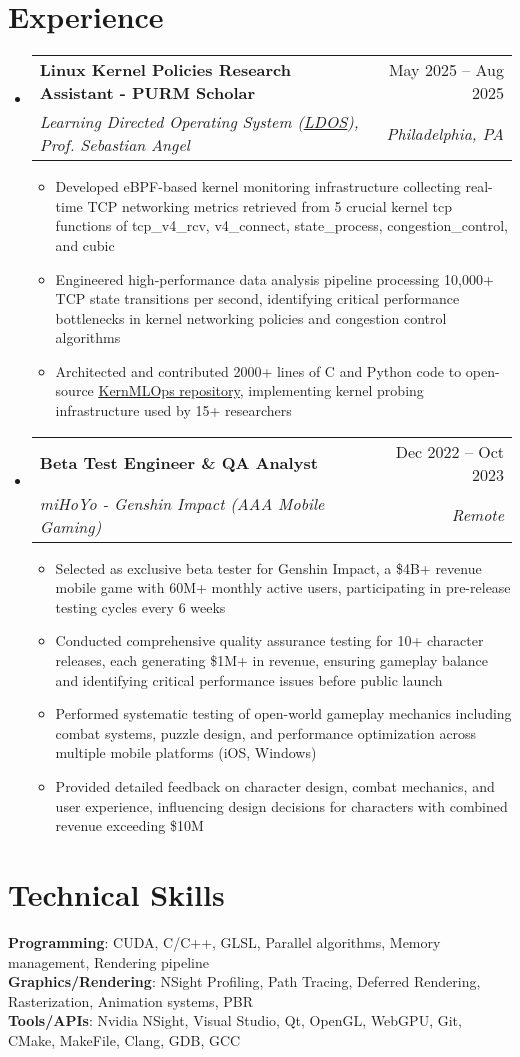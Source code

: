 \documentclass[letterpaper,11pt]{article}
\makeatletter
\newcommand{\resumeItem}[1]{
  \item\small{
    {#1 \vspace{-3pt}}
  }
}
\newcommand{\resumeSubheading}[4]{
  \vspace{-2pt}\item
    \begin{tabular*}{0.97\textwidth}[t]{l@{\extracolsep{\fill}}r}
      \textbf{#1} & #2 \\
      \textit{\small#3} & \textit{\small #4} \\
    \end{tabular*}\vspace{-7pt}
}
\newcommand{\resumeSubHeadingListStart}{\begin{itemize}[leftmargin=0.15in, label={}]}
\newcommand{\resumeSubHeadingListEnd}{\end{itemize}}
\newcommand{\resumeItemListStart}{\begin{itemize}}
\newcommand{\resumeItemListEnd}{\end{itemize}\vspace{-5pt}}
\makeatother
\begin{document}
\section{Experience}
  \resumeSubHeadingListStart
    \resumeSubheading
      {Linux Kernel Policies Research Assistant - PURM Scholar}{May 2025 -- Aug 2025}
      {Learning Directed Operating System (\href{https://ldos.utexas.edu/}{\underline{LDOS}}), Prof. Sebastian Angel}{Philadelphia, PA}
      \resumeItemListStart
        \resumeItem{Developed eBPF-based kernel monitoring infrastructure collecting real-time TCP networking metrics retrieved from 5 crucial kernel tcp functions of tcp\_v4\_rcv, v4\_connect, state\_process, congestion\_control, and cubic}
        \resumeItem{Engineered high-performance data analysis pipeline processing 10,000+ TCP state transitions per second, identifying critical performance bottlenecks in kernel networking policies and congestion control algorithms}
        \resumeItem{Architected and contributed 2000+ lines of C and Python code to open-source \href{https://github.com/tonytgrt/KernMLOps/tree/main}{\underline{KernMLOps repository}}, implementing kernel probing infrastructure used by 15+ researchers}
      \resumeItemListEnd


    \resumeSubheading
      {Beta Test Engineer \& QA Analyst}{Dec 2022 -- Oct 2023}
      {miHoYo - Genshin Impact (AAA Mobile Gaming)}{Remote}
      \resumeItemListStart
        \resumeItem{Selected as exclusive beta tester for Genshin Impact, a \$4B+ revenue mobile game with 60M+ monthly active users, participating in pre-release testing cycles every 6 weeks}
        \resumeItem{Conducted comprehensive quality assurance testing for 10+ character releases, each generating \$1M+ in revenue, ensuring gameplay balance and identifying critical performance issues before public launch}
        \resumeItem{Performed systematic testing of open-world gameplay mechanics including combat systems, puzzle design, and performance optimization across multiple mobile platforms (iOS, Windows)}
        \resumeItem{Provided detailed feedback on character design, combat mechanics, and user experience, influencing design decisions for characters with combined revenue exceeding \$10M}
      \resumeItemListEnd
  \resumeSubHeadingListEnd


\enlargethispage{20pt}


%
\section{Technical Skills}
 \begin{itemize}[leftmargin=0.15in, label={}]
    \small{\item{
    \textbf{Programming}{: CUDA, C/C++, GLSL, Parallel algorithms, Memory management, Rendering pipeline} \\
    \textbf{Graphics/Rendering}{: NSight Profiling, Path Tracing, Deferred Rendering, Rasterization, Animation systems, PBR} \\
    \textbf{Tools/APIs}{: Nvidia NSight, Visual Studio, Qt, OpenGL, WebGPU, Git, CMake, MakeFile, Clang, GDB, GCC}
    }}
 \end{itemize}


\end{document}
